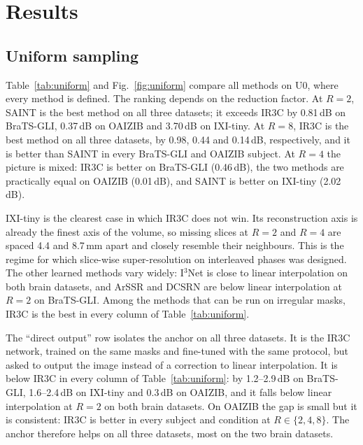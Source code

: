 \documentclass[a4paper,fleqn]{cas-dc}
\newcommand{\Ithree}{I$^3$Net\xspace}
\begin{document}
\section{Results}
\label{sec:results}

\subsection{Uniform sampling}
\label{sec:res-uniform}

Table~\ref{tab:uniform} and Fig.~\ref{fig:uniform} compare all methods on U0, where every
method is defined. The ranking depends on the reduction factor. At $R=2$, SAINT is the best
method on all three datasets; it exceeds IR3C by 0.81\,dB on BraTS-GLI, 0.37\,dB on OAIZIB and
3.70\,dB on IXI-tiny. At $R=8$, IR3C is the best method on all three datasets, by 0.98, 0.44 and
0.14\,dB, respectively, and it is better than SAINT in every BraTS-GLI and OAIZIB subject. At
$R=4$ the picture is mixed: IR3C is better on BraTS-GLI (0.46\,dB), the two methods are
practically equal on OAIZIB (0.01\,dB), and SAINT is better on IXI-tiny (2.02\,dB).

IXI-tiny is the clearest case in which IR3C does not win. Its reconstruction axis is already
the finest axis of the volume, so missing slices at $R=2$ and $R=4$ are spaced 4.4 and 8.7\,mm
apart and closely resemble their neighbours. This is the regime for which slice-wise
super-resolution on interleaved phases was designed. The other learned methods vary widely:
\Ithree is close to linear interpolation on both brain datasets, and ArSSR and DCSRN are
below linear interpolation at $R=2$ on BraTS-GLI. Among the methods that can be run on
irregular masks, IR3C is the best in every column of Table~\ref{tab:uniform}.

The ``direct output'' row isolates the anchor on all three datasets. It is the IR3C network,
trained on the same masks and fine-tuned with the same protocol, but asked to output the
image instead of a correction to linear interpolation. It is below IR3C in every column of
Table~\ref{tab:uniform}: by 1.2--2.9\,dB on BraTS-GLI, 1.6--2.4\,dB on IXI-tiny and
0.3\,dB on OAIZIB, and it falls below linear interpolation at $R=2$ on both brain
datasets. On OAIZIB the gap is small but it is consistent: IR3C is better in every subject
and condition at $R\in\{2,4,8\}$. The anchor therefore helps on all three datasets, most on
the two brain datasets.
\end{document}
